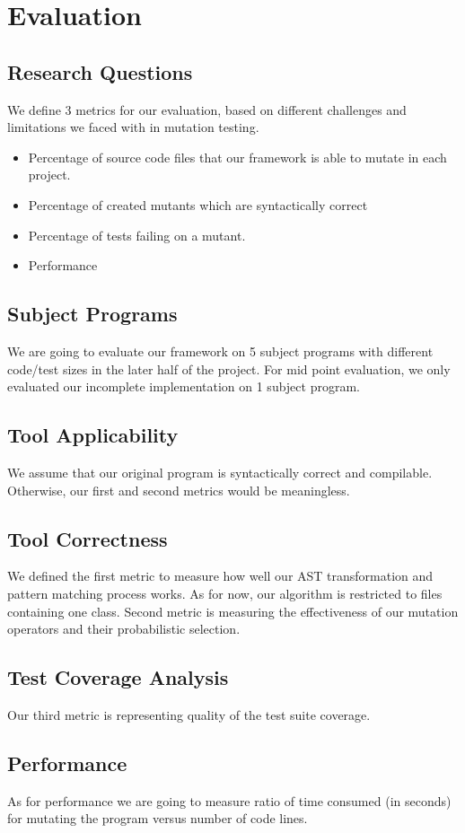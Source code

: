 \section{Evaluation}

\subsection{Research Questions}
We define 3 metrics for our evaluation, based on different challenges and limitations we faced with in mutation testing.
\begin{itemize} 
\item Percentage of source code files that our framework is able to mutate in each project. 
\item Percentage of created mutants which are syntactically correct
\item Percentage of tests failing on a mutant. 
\item Performance
\end{itemize}

\subsection{Subject Programs}
We are going to evaluate our framework on 5 subject programs with different code/test sizes in the later half of the project. For mid point evaluation, we only evaluated our incomplete implementation on 1 subject program. 

\subsection{Tool Applicability}

We assume that our original program is syntactically correct and compilable. Otherwise, our first and second metrics would be meaningless.  

\subsection{Tool Correctness}
We defined the first metric to measure how well our AST transformation and pattern matching process works. As for now, our algorithm is restricted to files containing one class. Second metric is measuring the effectiveness of our mutation operators and their probabilistic selection.
\subsection{Test Coverage Analysis}
Our third metric is representing quality of the test suite coverage. 
\subsection{Performance}
As for performance we are going to measure ratio of time consumed (in seconds) for mutating the program versus number of code lines. 

